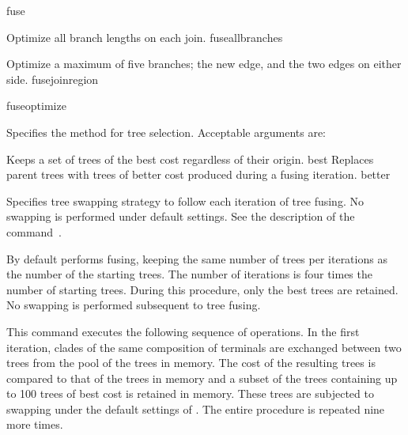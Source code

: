 \begin{command}{fuse}{}
\begin{arguments}
{\begin{description}
                    {Optimize all branch lengths on each join.}
                    {fuseallbranches}

                    {Optimize a maximum of five branches; the new edge, and the two
                    edges on either side.}
                    {fusejoinregion}

            \end{description}
            }
            {fuseoptimize}

            {Specifies the method for tree selection. Acceptable arguments are:
            \begin{description}
                  {}
                    {Keeps a set of trees of the best cost regardless of their origin.}
                     {best}
                  {}
                    {Replaces parent trees with trees of better cost produced during a fusing iteration.}
                    {better}
            \end{description}
            }
            {}

            {Specifies tree swapping strategy to follow each iteration of tree fusing.
            No swapping is performed under default settings.
            See the description of the command~.}
            {}
            
    \end{arguments}
    
        {By default \poy performs fusing, keeping the same number of trees per
        iterations as the number of the starting trees. The number of iterations is
        four times the number of starting trees. During this procedure, only the best
        trees are retained. No swapping is performed subsequent to tree fusing.}
        
    \begin{poyexamples}
    
            {This command executes the following sequence of operations. In the
            first iteration, clades of the same composition of terminals are exchanged
            between two trees from the pool of the trees in memory. The cost of the
            resulting trees is compared to that of the trees in memory and a subset of
            the trees containing up to 100 trees of best cost is retained in memory.
            These trees are subjected to swapping under the default settings of
            . The entire procedure is repeated nine more times.}
            

\end{poyexamples}
\end{command}

